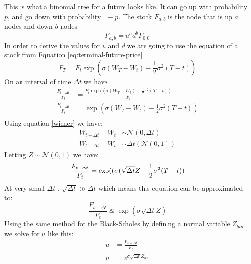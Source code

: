 \documentclass[12pt]{article}
\numberwithin{equation}{section}
\begin{document}
This is what a binomial tree for a future looks like. It can go up with probability $p$, and go down with probability $1-p$. The stock $F_{a,b}$ is the node that is up $a$ nodes and down $b$ nodes
\begin{equation}
	F_{a,b} = u^a d^b F_{0,0}
\end{equation}
In order to derive the values for $u$ and $d$ we are going to use the equation of a stock from Equation \ref{eq:terminal-future-price}
\begin{equation*} 
	F_T = F_t \exp(\sigma(W_T - W_t) - \frac{1}{2}\sigma^2 (T-t))
\end{equation*}
On an interval of time $\Delta t$ we have
\begin{equation*} 
	\begin{aligned}
		\frac{F_{t+\Delta t}}{F_t} &= \frac{F_t \exp((\sigma(W_T - W_t) - \frac{1}{2}\sigma^2 (T-t))}{F_t} \\
		\frac{F_{t+\Delta t}}{F_t} &= \exp(\sigma(W_T - W_t) - \frac{1}{2}\sigma^2 (T-t)) \\
	\end{aligned}
\end{equation*}
Using equation \ref{wiener} we have:
\begin{equation*}
	\begin{aligned}
		W_{t+\Delta t} - W_t &\sim \mathcal {N} (0, \Delta t) \\
		W_{t+\Delta t} - W_t &\sim \Delta t (\mathcal {N} (0,1) )
	\end{aligned}
\end{equation*}
Letting $Z \sim \mathcal{N}(0,1)$ we have:
\begin{equation*}
	\frac{F_{t+\Delta t}}{F_t} =\exp((\sigma(\sqrt{\Delta t} Z - \frac{1}{2}\sigma^2 (T-t)) \\
\end{equation*}
At very small $\Delta t$ , $\sqrt{\Delta t} \gg \Delta t$  which means this equation can be approximated to:
\begin{equation}
	\frac{F_{t+\Delta t}}{F_t} \approxeq \exp(\sigma \sqrt{\Delta t} Z) 
\end{equation}
Using the same method for the Black-Scholes by defining a normal variable $Z_{bin}$ we solve for $u$ like this:
\begin{equation*}
	\begin{aligned}
		u &= \frac{F_{t+ \Delta t}}{F_t} \\
		u &= e^{\sigma  \sqrt{\Delta t} Z_{bin}} \\
	\end{aligned}
\end{equation*}
\end{document}
